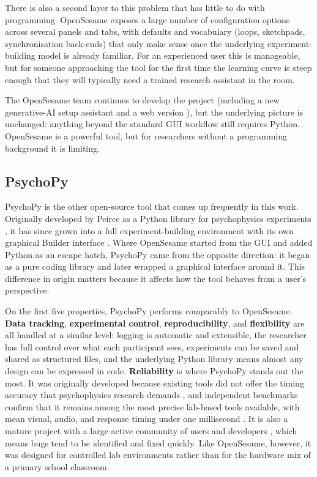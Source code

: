 There is also a second layer to this problem that has little to do with programming. OpenSesame exposes a large number of configuration options across several panels and tabs, with defaults and vocabulary (loops, sketchpads, synchronisation back-ends) that only make sense once the underlying experiment-building model is already familiar. For an experienced user this is manageable, but for someone approaching the tool for the first time the learning curve is steep enough that they will typically need a trained research assistant in the room.

The OpenSesame team continues to develop the project (including a new generative-AI setup assistant \cite{sigmundai} and a web version \cite{mathot2022osweb}), but the underlying picture is unchanged: anything beyond the standard GUI workflow still requires Python. OpenSesame is a powerful tool, but for researchers without a programming background it is limiting.

\subsection{PsychoPy}
PsychoPy is the other open-source tool that comes up frequently in this work. Originally developed by Peirce as a Python library for psychophysics experiments \cite{peirce_psychopypsychophysics_2007}, it has since grown into a full experiment-building environment with its own graphical Builder interface \cite{peirce2019psychopy2}. Where OpenSesame started from the GUI and added Python as an escape hatch, PsychoPy came from the opposite direction: it began as a pure coding library and later wrapped a graphical interface around it. This difference in origin matters because it affects how the tool behaves from a user's perspective.

On the first five properties, PsychoPy performs comparably to OpenSesame. \textbf{Data tracking}, \textbf{experimental control}, \textbf{reproducibility}, and \textbf{flexibility} are all handled at a similar level: logging is automatic and extensible, the researcher has full control over what each participant sees, experiments can be saved and shared as structured files, and the underlying Python library means almost any design can be expressed in code. \textbf{Reliability} is where PsychoPy stands out the most. It was originally developed because existing tools did not offer the timing accuracy that psychophysics research demands \cite{peirce_psychopypsychophysics_2007}, and independent benchmarks confirm that it remains among the most precise lab-based tools available, with mean visual, audio, and response timing under one millisecond \cite{bridges2020timing}. It is also a mature project with a large active community of users and developers \cite{peirce2019psychopy2}, which means bugs tend to be identified and fixed quickly. Like OpenSesame, however, it was designed for controlled lab environments rather than for the hardware mix of a primary school classroom.

